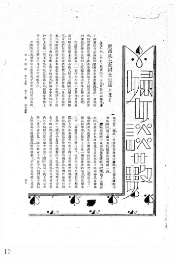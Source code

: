 \documentclass[12pt,twoside]{report}
\begin{document}
\begin{appendices}
\begin{figure}[htbp]
    \begin{subfigure}[b]{0.23\linewidth}
        \includegraphics[width=\linewidth]{./figures/testset/17.jpg}
        \caption{17}
        \label{fig:test_17}
    \end{subfigure}
    \hfill
    \begin{subfigure}[b]{0.23\linewidth}

\end{subfigure}
\end{figure}
\end{appendices}
\end{document}
